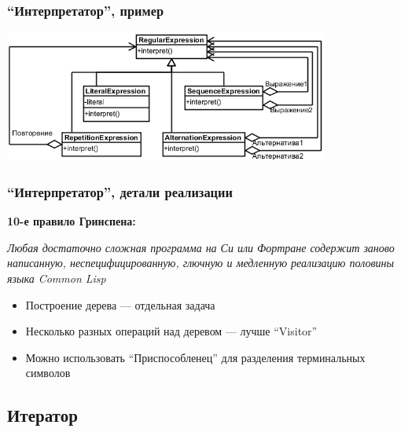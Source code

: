 \documentclass[xetex,mathserif,serif]{beamer}
\begin{document}
    \begin{frame}
        \frametitle{``Интерпретатор'', пример}
        \begin{center}
            \includegraphics[width=0.8\textwidth]{regexp.png}
        \end{center}
    \end{frame}

    \begin{frame}
        \frametitle{``Интерпретатор'', детали реализации}
        \begin{footnotesize}
            \textbf{10-е правило Гринспена:}
            
            \textit{Любая достаточно сложная программа на Си или Фортране содержит заново написанную, неспецифицированную, глючную и медленную реализацию половины языка Common Lisp}
        \end{footnotesize}
        \begin{itemize}
            \item Построение дерева --- отдельная задача
            \item Несколько разных операций над деревом --- лучше ``Visitor''
            \item Можно использовать ``Приспособленец'' для разделения терминальных символов
        \end{itemize}
    \end{frame}

    \subsection{Итератор}
\end{document}
